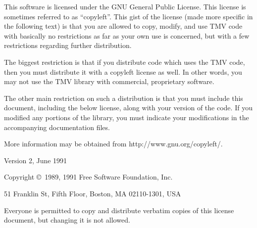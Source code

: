 \documentclass[twoside,letterpaper,11pt]{article}
\begin{document}
This software is licensed under the GNU General Public License.  This license is
sometimes referred to as ``copyleft''.  This gist of the license (made more specific
in the following text) is that you are allowed to copy, modify, and use TMV code
with basically no restrictions as far as your own use is concerned, 
but with a few restrictions regarding further distribution.

The biggest restriction is that if you distribute code which
uses the TMV code, then you must distribute it with a copyleft license as well.
In other words, you may not use the TMV library with commercial, proprietary 
software. 

The other main restriction on such a distribution is that you must include this 
document,
including the below license, along with your version of the code.  If you modified
any portions of the library, you must indicate your modifications in the accompanying
documentation files.

More information may be obtained from http://www.gnu.org/copyleft/.

\begin{center}
{\parindent 0in

Version 2, June 1991

Copyright \copyright\ 1989, 1991 Free Software Foundation, Inc.

\bigskip

51 Franklin St, Fifth Floor, Boston, MA  02110-1301, USA

\bigskip

Everyone is permitted to copy and distribute verbatim copies
of this license document, but changing it is not allowed.
}
\end{center}
\end{document}
